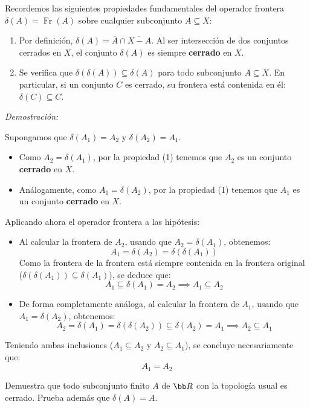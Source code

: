 \begin{sol}
\begin{enumerate}
    Recordemos las siguientes propiedades fundamentales del operador frontera $\delta(A) = \operatorname{Fr}(A)$ sobre cualquier subconjunto $A \subseteq X$:
    \begin{enumerate}[label=\arabic*)]
        \item Por definición, $\delta(A) = \overline{A} \cap \overline{X - A}$. Al ser intersección de dos conjuntos cerrados en $X$, el conjunto $\delta(A)$ es siempre \textbf{cerrado} en $X$.
        \item Se verifica que $\delta(\delta(A)) \subseteq \delta(A)$ para todo subconjunto $A \subseteq X$. En particular, si un conjunto $C$ es cerrado, su frontera está contenida en él: $\delta(C) \subseteq C$.
    \end{enumerate}

    \textit{Demostración:}

    Supongamos que $\delta(A_1) = A_2$ y $\delta(A_2) = A_1$.

    \begin{itemize}
        \item Como $A_2 = \delta(A_1)$, por la propiedad (1) tenemos que $A_2$ es un conjunto \textbf{cerrado} en $X$.
        \item Análogamente, como $A_1 = \delta(A_2)$, por la propiedad (1) tenemos que $A_1$ es un conjunto \textbf{cerrado} en $X$.
    \end{itemize}

    Aplicando ahora el operador frontera a las hipótesis:
    \begin{itemize}
        \item Al calcular la frontera de $A_2$, usando que $A_2 = \delta(A_1)$, obtenemos:
        \[
            A_1 = \delta(A_2) = \delta(\delta(A_1))
        \]
        Como la frontera de la frontera está siempre contenida en la frontera original ($\delta(\delta(A_1)) \subseteq \delta(A_1)$), se deduce que:
        \[
            A_1 \subseteq \delta(A_1) = A_2 \implies A_1 \subseteq A_2
        \]

        \item De forma completamente análoga, al calcular la frontera de $A_1$, usando que $A_1 = \delta(A_2)$, obtenemos:
        \[
            A_2 = \delta(A_1) = \delta(\delta(A_2)) \subseteq \delta(A_2) = A_1 \implies A_2 \subseteq A_1
        \]
    \end{itemize}

    Teniendo ambas inclusiones ($A_1 \subseteq A_2$ y $A_2 \subseteq A_1$), se concluye necesariamente que:
    \[
        A_1 = A_2
    \]
    
    \end{enumerate}
\end{sol}
\begin{ejer}
[52] Demuestra que todo subconjunto finito $A$ de $\bb R$ con la topología usual es cerrado. Prueba además que
$\delta(A) = A$.
\end{ejer}

